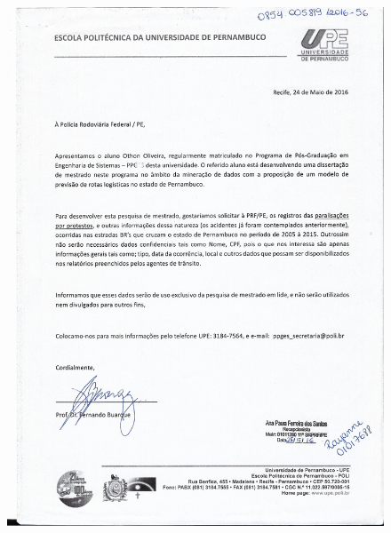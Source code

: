 \begin{figure}[ht!]
		\includegraphics[scale=0.30]{Figuras/Anexos/A1-PRFDadospg_003.pdf}
		\qquad \quad \quad

\end{figure}

